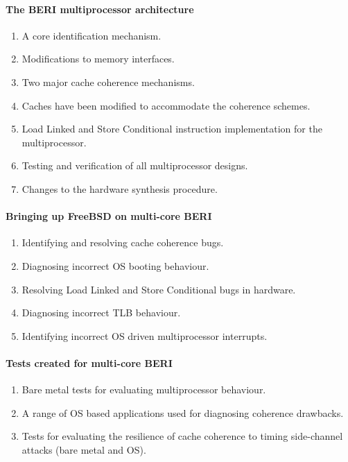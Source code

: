 		\paragraph{The BERI multiprocessor architecture}
			\begin{enumerate}
				\item A core identification mechanism.
				\item Modifications to memory interfaces.
				\item Two major cache coherence mechanisms.
				\item Caches have been modified to accommodate the coherence schemes.
				\item Load Linked and Store Conditional instruction implementation for the multiprocessor.
				\item Testing and verification of all multiprocessor designs.
				\item Changes to the hardware synthesis procedure.
			\end{enumerate}

		\paragraph{Bringing up FreeBSD on multi-core BERI}
			\begin{enumerate}
				\item Identifying and resolving cache coherence bugs.
				\item Diagnosing incorrect OS booting behaviour.
				\item Resolving Load Linked and Store Conditional bugs in hardware.
				\item Diagnosing incorrect TLB behaviour.
				\item Identifying incorrect OS driven multiprocessor interrupts.
			\end{enumerate}	
		\paragraph{Tests created for multi-core BERI}
			\begin{enumerate}
				\item Bare metal tests for evaluating multiprocessor behaviour.
				\item A range of OS based applications used for diagnosing coherence drawbacks.
				\item Tests for evaluating the resilience of cache coherence to timing side-channel attacks (bare metal and OS).
			\end{enumerate}

